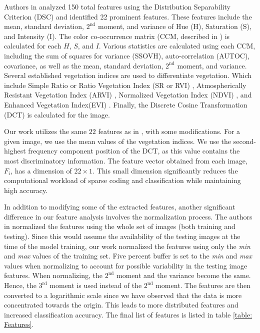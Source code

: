 \documentclass[11pt]{article}
\begin{document}
Authors in \cite{Basu2015} analyzed 150 total features using the Distribution Separability Criterion (DSC) and identified 22 prominent features. These features include the mean, standard deviation, $2^\textrm{nd}$ moment, and variance of Hue (H), Saturation (S), and Intensity (I). The color co-occurrence matrix (CCM, described in \cite{Boyda2017}) is calculated for each $H$, $S$, and $I$. Various statistics are calculated using each CCM, including the sum of squares for variance (SSOVH), auto-correlation (AUTOC), covariance, as well as the mean, standard deviation, $2^\textrm{nd}$ moment, and variance. Several established vegetation indices are used to differentiate vegetation. Which include Simple Ratio or Ratio Vegetation Index (SR or RVI) \cite{Jordan1969}, Atmospherically Resistant Vegetation Index (ARVI) \cite{Kaufman1992}, Normalized Vegetation Index (NDVI) \cite{Rouse1974}, and Enhanced Vegetation Index(EVI) \cite{Huete2002}. Finally, the Discrete Cosine Transformation (DCT) is calculated for the image.

Our work utilizes the same $22$ features as in \cite{Basu2015}, with some modifications. For a given image, we use the mean values of the vegetation indices. We use the second-highest frequency component position of the DCT, as this value contains the most discriminatory information. The feature vector obtained from each image, $F_i$, has a dimension of $22\times1$. This small dimension significantly reduces the computational workload of sparse coding and classification while maintaining high accuracy.

In addition to modifying some of the extracted features, another significant difference in our feature analysis involves the normalization process. The authors in \cite{Basu2015} normalized the features using the whole set of images (both training and testing). Since this would assume the availability of the testing images at the time of the model training, our work normalized the features using only the \textit{min} and \textit{max} values of the training set. Five percent buffer is set to the \textit{min} and \textit{max} values when normalizing to account for possible variability in the testing image features. When normalizing, the $2^\textrm{nd}$ moment and the variance become the same. Hence, the $3^\textrm{rd}$ moment is used instead of the $2^\textrm{nd}$ moment. The features are then converted to a logarithmic scale since we have observed that the data is more concentrated towards the origin. This leads to more distributed features and increased classification accuracy. The final list of features is listed in table \ref{table: Features}.
\end{document}
